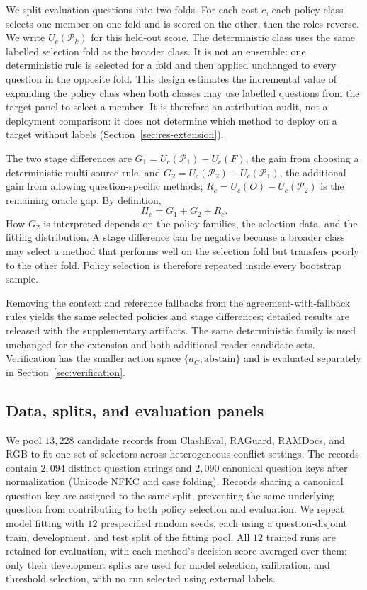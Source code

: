 \documentclass[sigconf]{acmart}
\newcommand{\ac}{a_C}
\begin{document}
We split evaluation questions into two folds. For each cost $c$, each
policy class selects one member on one fold and is scored on the other,
then the roles reverse. We write $U_c(\mathcal{P}_k)$ for this held-out
score. The deterministic class uses the same labelled selection fold as
the broader class. It is not an ensemble: one deterministic rule is
selected for a fold and then applied unchanged to every question in the
opposite fold.
This design estimates the incremental value of expanding the policy
class when both classes may use labelled questions from the target
panel to select a member. It is therefore an attribution audit, not a
deployment comparison: it does not determine which method to deploy on
a target without labels (Section~\ref{sec:res-extension}).

The two stage differences are $G_1=U_c(\mathcal{P}_1)-U_c(F)$, the
gain from choosing a deterministic multi-source rule, and
$G_2=U_c(\mathcal{P}_2)-U_c(\mathcal{P}_1)$, the additional gain from
allowing question-specific methods;
$R_c=U_c(O)-U_c(\mathcal{P}_2)$ is the remaining oracle gap. By
definition,
\begin{equation}
  H_c = G_1+G_2+R_c.
\end{equation}
How $G_2$ is interpreted depends on the policy families, the selection
data, and the fitting distribution.
A stage difference can be negative because a broader class may select a
method that performs well on the selection fold but transfers poorly to
the other fold. Policy selection is therefore repeated inside every
bootstrap sample.

Removing the context and reference fallbacks from the
agreement-with-fallback rules yields the same selected policies and
stage differences; detailed results are released with the supplementary
artifacts. The same deterministic family is used unchanged for the
extension and both additional-reader candidate sets. Verification has
the smaller action space $\{\ac,\text{abstain}\}$ and is evaluated
separately in Section~\ref{sec:verification}.

\subsection{Data, splits, and evaluation panels}
\label{sec:data}

We pool $13{,}228$ candidate records from ClashEval, RAGuard,
RAMDocs, and RGB to fit one set of selectors across heterogeneous
conflict settings. The records contain $2{,}094$ distinct question
strings and $2{,}090$ canonical question keys after normalization
(Unicode NFKC and case folding). Records sharing a canonical
question key are assigned to the same split, preventing the same
underlying question from contributing to both policy selection and
evaluation. 
We repeat model fitting with $12$ prespecified random seeds, each using
a question-disjoint train, development, and test split of the fitting
pool. All $12$ trained runs are retained for evaluation, with each
method's decision score averaged over them; only their
development splits are used for model selection, calibration, and
threshold selection, with no run selected using external labels.
\end{document}
